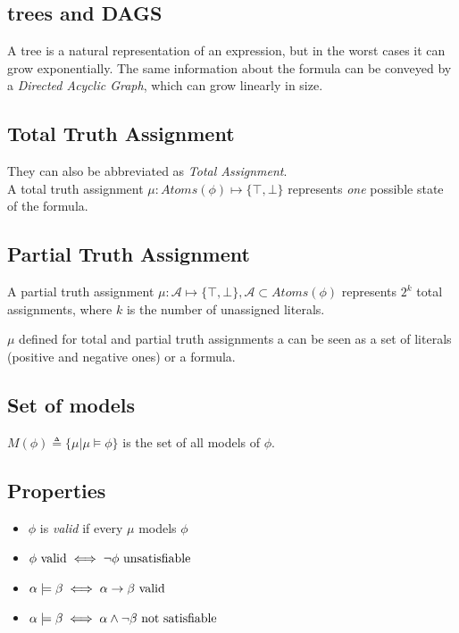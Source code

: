 \documentclass{article}
\begin{document}
\subsection*{trees and DAGS}
A tree is a natural representation of an expression, but in the worst cases it can grow exponentially. The same information about the formula can be conveyed by a \textit{Directed Acyclic Graph}, which can grow linearly in size.

\subsection*{Total Truth Assignment}
They can also be abbreviated as \textit{Total Assignment}.\\
A total truth assignment $\mu: Atoms(\phi)\mapsto\{\top,\bot\}$ represents \textit{one} possible state of the formula.

\subsection*{Partial Truth Assignment}
A partial truth assignment $\mu: \mathcal A \mapsto\{\top,\bot\}, \mathcal A\subset Atoms(\phi)$ represents $2^k$ total assignments, where $k$ is the number of unassigned literals.

$\mu$ defined for total and partial truth assignments a can be seen as a set of literals (positive and negative ones) or a formula.

\subsection*{Set of models}
$M(\phi) \triangleq \{\mu | \mu\models\phi\}$ is the set of all models of $\phi$.

\subsection*{Properties}
\begin{itemize}
    \item $\phi$ is \textit{valid} if every $\mu$ models $\phi$
    \item $\phi\ \text{valid} \iff \neg\phi\text{ unsatisfiable}$
    \item $\alpha\models\beta \iff \alpha\to\beta\text{ valid}$
    \item $\alpha\models\beta \iff \alpha\wedge\neg\beta\ \text{not satisfiable}$\reversemarginpar{}
\end{itemize}
\end{document}
